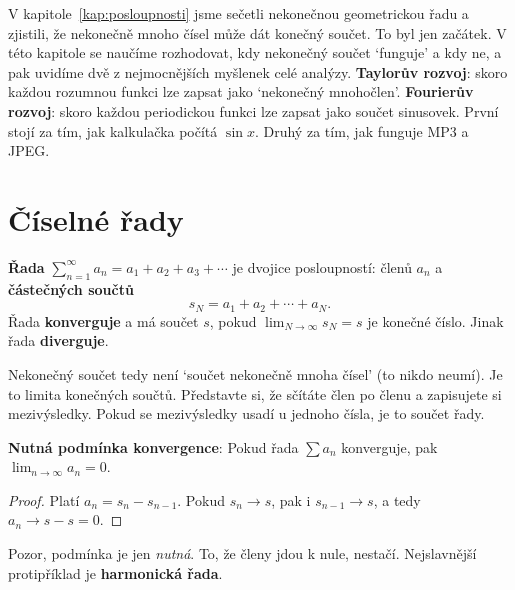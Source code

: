 \label{kap:rady}

V kapitole~\ref{kap:posloupnosti} jsme sečetli nekonečnou geometrickou řadu a zjistili, že nekonečně mnoho čísel může dát konečný součet. To byl jen začátek. V této kapitole se naučíme rozhodovat, kdy nekonečný součet `funguje' a kdy ne, a pak uvidíme dvě z nejmocnějších myšlenek celé analýzy. \textbf{Taylorův rozvoj}: skoro každou rozumnou funkci lze zapsat jako `nekonečný mnohočlen'. \textbf{Fourierův rozvoj}: skoro každou periodickou funkci lze zapsat jako součet sinusovek. První stojí za tím, jak kalkulačka počítá $\sin x$. Druhý za tím, jak funguje MP3 a JPEG.

\section{Číselné řady}

\begin{definitionbox}
  \textbf{Řada} $\sum_{n=1}^{\infty}a_n = a_1 + a_2 + a_3 + \cdots$ je dvojice posloupností: členů $a_n$ a \textbf{částečných součtů}
  \begin{equation*}
    s_N = a_1 + a_2 + \cdots + a_N.
  \end{equation*}
  Řada \textbf{konverguje} a má součet $s$, pokud $\lim_{N\to\infty}s_N = s$ je konečné číslo. Jinak řada \textbf{diverguje}.
\end{definitionbox}

Nekonečný součet tedy není `součet nekonečně mnoha čísel' (to nikdo neumí). Je to limita konečných součtů. Představte si, že sčítáte člen po členu a zapisujete si mezivýsledky. Pokud se mezivýsledky usadí u jednoho čísla, je to součet řady.

\begin{definitionbox}
  \textbf{Nutná podmínka konvergence}: Pokud řada $\sum a_n$ konverguje, pak $\lim_{n\to\infty}a_n = 0$.
\end{definitionbox}

\begin{proof}
  Platí $a_n = s_n - s_{n-1}$. Pokud $s_n\to s$, pak i $s_{n-1}\to s$, a tedy $a_n\to s - s = 0$.
\end{proof}

Pozor, podmínka je jen \textit{nutná}. To, že členy jdou k nule, nestačí. Nejslavnější protipříklad je \textbf{harmonická řada}.

